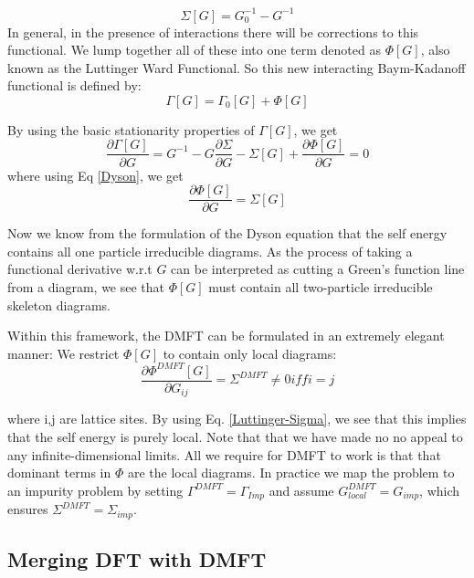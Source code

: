 \documentclass[12pt,letter]{article}
\begin{document}
\begin{equation}\label{Dyson}
 \Sigma[G]= G_0^{-1}- G^{-1}
\end{equation}
In general, in the presence of interactions there will be corrections to this functional. We lump together all of these into one term denoted as $\Phi[G]$, also known as the Luttinger Ward Functional. So this new interacting Baym-Kadanoff functional is defined by:
\begin{equation}
\Gamma[G]=\Gamma_0[G]+\Phi[G]
\end{equation}

By using the basic stationarity properties of $\Gamma[G]$, we get
\begin{equation}
\dfrac{\partial \Gamma[G]}{\partial G}= G^{-1} -G \dfrac{\partial \Sigma}{\partial G} -\Sigma[G] +\dfrac{\partial \Phi[G]}{\partial G}=0
\end{equation}
 where using Eq \ref{Dyson}, we get
 \begin{equation}\label{Luttinger-Sigma}
 \dfrac{\partial \Phi[G]}{\partial G}=\Sigma[G]
 \end{equation}
 
 Now we know from the formulation of the Dyson equation that the self energy contains all one particle irreducible diagrams. As the process of taking a functional derivative w.r.t $G$ can be interpreted as cutting a Green's function line from a diagram, we see that $\Phi[G]$ must contain all two-particle irreducible skeleton diagrams. 
 
Within this framework, the DMFT can be formulated in an extremely elegant manner: We restrict $\Phi[G]$ to contain only local diagrams:
\begin{equation}
 \dfrac{\partial \Phi^{DMFT}[G]}{\partial G_{ij}} =\Sigma^{DMFT} \neq 0 iff i=j
\end{equation}

where i,j are lattice sites. By using Eq. \ref{Luttinger-Sigma}, we see that this implies that the self energy is purely local. Note that that we have made no no appeal to any infinite-dimensional limits. All we require for DMFT to work is that that dominant terms in $\Phi$ are the local diagrams. In practice we map the problem to an impurity problem by setting  $\Gamma^{DMFT}=\Gamma_{Imp}$ and assume $G^{DMFT}_{local}= G_{imp}$, which ensures $\Sigma^{DMFT}= \Sigma_{imp}$.
 
\subsection{Merging DFT with DMFT} 
\end{document}
